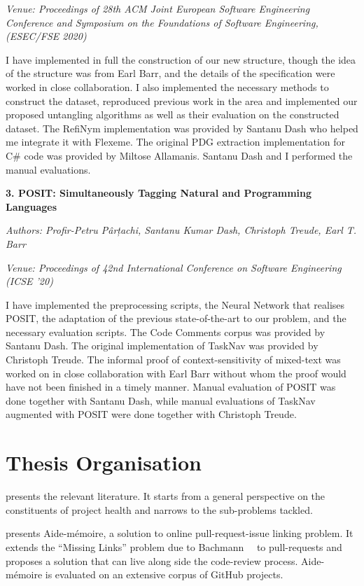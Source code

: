 \noindent\emph{Venue: Proceedings of 28th ACM Joint European Software
Engineering Conference and Symposium on the Foundations of Software Engineering,
(ESEC/FSE 2020)}

\noindent  I have implemented in full the construction of our new structure,
though the idea of the structure was from Earl Barr, and the details of the
specification were worked in close collaboration. I also implemented the
necessary methods to construct the dataset, reproduced previous work in the area
and implemented our proposed untangling algorithms as well as their evaluation
on the constructed dataset. The RefiNym implementation was provided by Santanu
Dash who helped me integrate it with Flexeme. The original PDG extraction
implementation for C\# code was provided by Miltose Allamanis. Santanu Dash and
I performed the manual evaluations.

\noindent\textbf{3. POSIT: Simultaneously Tagging Natural and Programming
Languages} 

\noindent\emph{Authors: Profir-Petru Pârțachi, Santanu Kumar Dash, Christoph
Treude, Earl T. Barr}

\noindent\emph{Venue: Proceedings of 42nd International Conference on Software
Engineering (ICSE ’20)}

\noindent I have implemented the preprocessing scripts, the Neural Network that
realises POSIT, the adaptation of the previous state-of-the-art to our problem,
and the necessary evaluation scripts. The Code Comments corpus was provided by
Santanu Dash. The original implementation of TaskNav was provided by Christoph
Treude. The informal proof of context-sensitivity of mixed-text was worked on in
close collaboration with Earl Barr without whom the proof would have not been
finished in a timely manner. Manual evaluation of POSIT was done together with
Santanu Dash, while manual evaluations of TaskNav augmented with POSIT were done
together with Christoph Treude.

\section{Thesis Organisation}
\label{chapter:introduction:sec:organisation}

 presents the relevant literature. It starts from a
general perspective on the constituents of project health and narrows to the
sub-problems tackled.

 presents Aide-mémoire, a solution to online pull-request-issue
linking problem. It extends the ``Missing Links'' problem due to
Bachmann~\etal~\cite{MissingLinks} to pull-requests and proposes a solution that
can live along side the code-review process. Aide-mémoire is evaluated on an
extensive corpus of GitHub projects.

